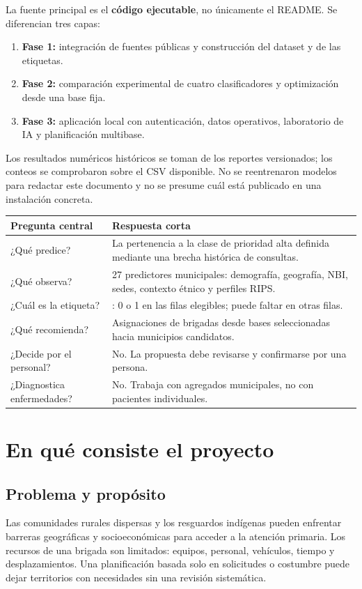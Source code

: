 \documentclass[11pt,a4paper]{report}
\newcommand{\campo}[1]{\texttt{\detokenize{#1}}}
\begin{document}
La fuente principal es el \textbf{código ejecutable}, no únicamente el README. Se diferencian tres capas:
\begin{enumerate}
\item \textbf{Fase 1:} integración de fuentes públicas y construcción del dataset y de las etiquetas.
\item \textbf{Fase 2:} comparación experimental de cuatro clasificadores y optimización desde una base fija.
\item \textbf{Fase 3:} aplicación local con autenticación, datos operativos, laboratorio de IA y planificación multibase.
\end{enumerate}
Los resultados numéricos históricos se toman de los reportes versionados; los conteos se comprobaron sobre el CSV disponible. No se reentrenaron modelos para redactar este documento y no se presume cuál está publicado en una instalación concreta.

\begin{center}
\begin{tabularx}{\textwidth}{@{}lX@{}}
\toprule
\textbf{Pregunta central} & \textbf{Respuesta corta}\\
\midrule
¿Qué predice? & La pertenencia a la clase de prioridad alta definida mediante una brecha histórica de consultas.\\
¿Qué observa? & 27 predictores municipales: demografía, geografía, NBI, sedes, contexto étnico y perfiles RIPS.\\
¿Cuál es la etiqueta? & \campo{prioridad_alta}: 0 o 1 en las filas elegibles; puede faltar en otras filas.\\
¿Qué recomienda? & Asignaciones de brigadas desde bases seleccionadas hacia municipios candidatos.\\
¿Decide por el personal? & No. La propuesta debe revisarse y confirmarse por una persona.\\
¿Diagnostica enfermedades? & No. Trabaja con agregados municipales, no con pacientes individuales.\\
\bottomrule
\end{tabularx}
\end{center}
\clearpage
{}

\chapter{En qué consiste el proyecto}
\section{Problema y propósito}
Las comunidades rurales dispersas y los resguardos indígenas pueden enfrentar barreras geográficas y socioeconómicas para acceder a la atención primaria. Los recursos de una brigada son limitados: equipos, personal, vehículos, tiempo y desplazamientos. Una planificación basada solo en solicitudes o costumbre puede dejar territorios con necesidades sin una revisión sistemática.
\end{document}
